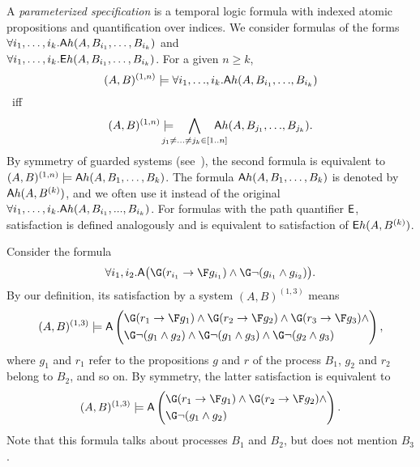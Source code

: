  \label{gua:sec:parameterized}
A \emph{parameterized specification} is a temporal logic formula
with indexed atomic propositions and quantification over indices. 
We consider formulas of the forms
$\forall{i_1,\ldots,i_k.} {\ensuremath{\operatorname{\mathsf{A}}}} h(A,B_{i_1},\ldots,B_{i_k})$ and\\ 
$\forall{i_1,\ldots,i_k.} {\ensuremath{\operatorname{\mathsf{E}}}} h(A,B_{i_1},\ldots,B_{i_k})$. 
For a given $n \geq k$, 
$$
(A,B)^{(1,n)} \models \forall{i_1,{\ldots},i_k.} {\ensuremath{\operatorname{\mathsf{A}}}} h(A,B_{i_1},{\ldots},B_{i_k})
$$
~iff~
$$
\largesys \models \!\!\!\!\!\!\!\!\bigwedge_{j_1 \neq {\ldots} \neq j_k \in [1..n]}\!\!\!\!\!\!\!\!\A h(A,B_{j_1},{\ldots},B_{j_k}).
$$ 
By symmetry of guarded systems (see~\cite{Emerson00}),
the second formula is equivalent to
$(A,B)^{(1,n)} \models {\ensuremath{\operatorname{\mathsf{A}}}} h(A,B_1,\ldots,B_k)$. 
The formula ${\operatorname{\mathsf{A}}} h(A,B_1,\ldots,B_k)$ is denoted by ${\operatorname{\mathsf{A}}} h(A,B^{(k)})$, 
and we often use it instead of the original $\forall{i_1,\ldots,i_k.} {\ensuremath{\operatorname{\mathsf{A}}}} h(A,B_{i_1},...,B_{i_k})$.
For formulas with the path quantifier ${\operatorname{\mathsf{E}}}$,
satisfaction is defined analogously
and is equivalent to satisfaction of ${\operatorname{\mathsf{E}}} h(A,B^{(k)})$.
\begin{example}
Consider the formula
$$
\forall{i_1,i_2}.\A \big(\G (r_{i_1} \impl \F g_{i_1}) \land \G \neg (g_{i_1} \land g_{i_2})\big).
$$
By our definition, its satisfaction by a system $(A,B)^{(1,3)}$ means
\begin{align*}
(A,B)^{(1,3)} \models
\A \left(
\begin{aligned}
&\G(r_1 \impl \F g_1) \land \G(r_2 \impl \F g_2) \land \G(r_3 \impl \F g_3) \land \\
&\G \neg (g_1 \land g_2) \land \G \neg (g_1 \land g_3) \land \G \neg (g_2 \land g_3)
\end{aligned}
\right),
\end{align*}
where $g_1$ and $r_1$ refer to the propositions $g$ and $r$ of the process $B_1$,
$g_2$ and $r_2$ belong to $B_2$, and so on.
By symmetry, the latter satisfaction is equivalent to
\begin{align*}
(A,B)^{(1,3)} \models
\A \left(
\begin{aligned}
&\G(r_1 \impl \F g_1) \land \G(r_2 \impl \F g_2) \land \\
&\G \neg (g_1 \land g_2)
\end{aligned}
\right).
\end{align*}
Note that this formula talks about processes $B_1$ and $B_2$, but does not mention $B_3$.
\end{example}


